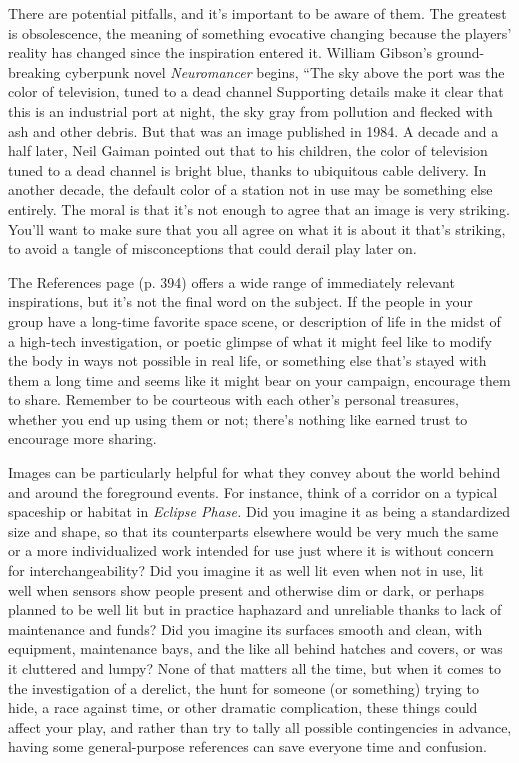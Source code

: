 There are potential pitfalls, and it's important to 
be aware of them. The greatest is obsolescence, the 
meaning of something evocative changing because 
the players' reality has changed since the inspiration 
entered it. William Gibson's ground-breaking cyberpunk
novel \textit{Neuromancer }begins, ``The sky above the
port was the color of television, tuned to a dead channel
Supporting details make it clear that this is an
industrial port at night, the sky gray from pollution 
and flecked with ash and other debris. But that was 
an image published in 1984. A decade and a half later, 
Neil Gaiman pointed out that to his children, the 
color of television tuned to a dead channel is bright 
blue, thanks to ubiquitous cable delivery. In another 
decade, the default color of a station not in use may 
be something else entirely. The moral is that it's not 
enough to agree that an image is very striking. You'll 
want to make sure that you all agree on what it is 
about it that's striking, to avoid a tangle of misconceptions
that could derail play later on.

The References page (p. 394) offers a wide range 
of immediately relevant inspirations, but it's not the 
final word on the subject. If the people in your group 
have a long-time favorite space scene, or description 
of life in the midst of a high-tech investigation, or 
poetic glimpse of what it might feel like to modify the 
body in ways not possible in real life, or something 
else that's stayed with them a long time and seems 
like it might bear on your campaign, encourage them 
to share. Remember to be courteous with each other's 
personal treasures, whether you end up using them 
or not; there's nothing like earned trust to encourage 
more sharing. 

Images can be particularly helpful for what they 
convey about the world behind and around the 
foreground events. For instance, think of a corridor 
on a typical spaceship or habitat in \textit{Eclipse Phase. }
Did you imagine it as being a standardized size and 
shape, so that its counterparts elsewhere would be 
very much the same or a more individualized work 
intended for use just where it is without concern 
for interchangeability? Did you imagine it as well 
lit even when not in use, lit well when sensors show 
people present and otherwise dim or dark, or perhaps 
planned to be well lit but in practice haphazard and 
unreliable thanks to lack of maintenance and funds? 
Did you imagine its surfaces smooth and clean, with 
equipment, maintenance bays, and the like all behind 
hatches and covers, or was it cluttered and lumpy? 
None of that matters all the time, but when it comes 
to the investigation of a derelict, the hunt for someone 
(or something) trying to hide, a race against time, or 
other dramatic complication, these things could affect 
your play, and rather than try to tally all possible contingencies
in advance, having some general-purpose
references can save everyone time and confusion. 

